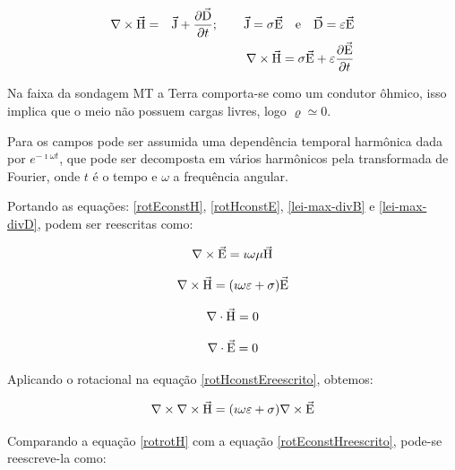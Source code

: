         {\setlength\arraycolsep{2pt}
        \begin{eqnarray}
            \label{rotHconstE}
            \nabla \times \vec{\textrm{H}} &=& \vec{\textrm{J}} + \dfrac{\partial \vec{\textrm{D}}}{\partial t}; \qquad \vec{\textrm{J}} = \sigma \vec{\textrm{E}} \quad \textrm{e} \quad \vec{\textrm{D}} = \varepsilon \vec{\textrm{E}}\nonumber \\
            & &\nabla \times \vec{\textrm{H}} =  \sigma \vec{\textrm{E}} + \varepsilon \dfrac{\partial \vec{\textrm{E}}}{\partial t}
        \end{eqnarray}}
        
        Na faixa da sondagem MT a Terra comporta-se como um condutor ôhmico, isso implica que o meio não possuem cargas livres, logo $\varrho \simeq 0$. 
        
        Para os campos pode ser assumida uma dependência temporal harmônica dada por $e^{- \imath \omega t}$, que pode ser decomposta em vários harmônicos pela transformada de Fourier, onde $t$ é o tempo e $\omega$ a frequência angular. 
    
        Portando as equações: \ref{rotEconstH}, \ref{rotHconstE}, \ref{lei-max-divB} e \ref{lei-max-divD}, podem ser reescritas como:
        
        \begin{equation}
            \label{rotEconstHreescrito}
            \nabla \times \vec{\textrm{E}} = \imath \omega \mu \vec{\textrm{H}}           
        \end{equation}
        
        \begin{equation}
            \label{rotHconstEreescrito}
            \nabla \times \vec{\textrm{H}} = (\imath \omega \varepsilon + \sigma) \vec{\textrm{E}}
        \end{equation}
        
        \begin{equation}
            \nabla \cdot \vec{\textrm{H}}  = 0
        \end{equation}

        \begin{equation}
            \nabla \cdot \vec{\textrm{E}} = 0
        \end{equation}

        Aplicando o rotacional na equação \ref{rotHconstEreescrito}, obtemos:
         
        \begin{equation}
            \label{rotrotH}
            \nabla \times \nabla \times \vec{\textrm{H}} = (\imath \omega \varepsilon + \sigma) \nabla \times \vec{\textrm{E}}
        \end{equation}

        Comparando a equação \ref{rotrotH} com a equação \ref{rotEconstHreescrito}, pode-se reescreve-la como:
        
